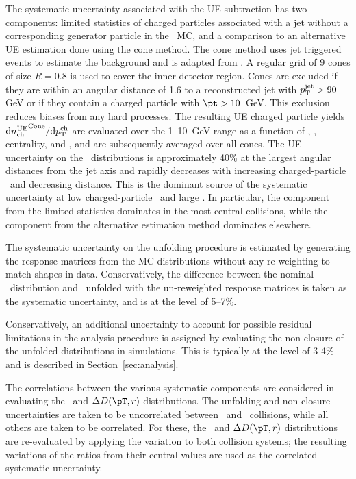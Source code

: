 The systematic uncertainty associated with the UE subtraction has two components: limited statistics of charged particles associated with a jet without a corresponding generator particle in the \pbpb\ MC, and a comparison to an alternative UE estimation done using the cone method. The cone method uses jet triggered events to estimate the background and is adapted from \cite{Aaboud:2018hpb, Aaboud:2017bzv}. A regular grid of 9 cones of size $R = 0.8$ is used to cover the inner detector region. Cones are excluded if they are within an angular distance of 1.6 to a reconstructed jet with $\mbox{$p_{\mathrm{T}}^{\mathrm{jet}}$} > 90$ GeV or if they contain a charged particle with \mbox{$\pt > 10$ GeV}. This exclusion reduces biases from any hard processes. The resulting UE charged particle yields $\mathrm{d} \mbox{$n_{\mathrm{ch}}^{\mathrm{UE}}$}^{\mathrm{Cone}}/ \mathrm{d} \mbox{$p_{{\mathrm{T}}}^{\mathrm{ch}}$}$ are evaluated over the \mbox{1--10 GeV} range as a function of \pttrk, \ptjet, centrality, and \rvar, and are subsequently averaged over all cones. The UE uncertainty on the \Dptr\ distributions is approximately 40\% at the largest angular distances from the jet axis and rapidly decreases with increasing charged-particle \pT\ and decreasing distance. This is the dominant source of the systematic uncertainty at low charged-particle \pt\ and large \rvar. In particular, the component from the limited statistics dominates in the most central collisions, while the component from the alternative estimation method dominates elsewhere.


The systematic uncertainty on the unfolding procedure is estimated by generating the response matrices from the MC distributions without any re-weighting to match shapes in data. Conservatively, the difference between the nominal \Dptr\ distribution and \Dptr\ unfolded with the un-reweighted response matrices is taken as the systematic uncertainty, and is at the level of 5--7\%.

Conservatively, an additional uncertainty to account for possible residual limitations in the analysis procedure is assigned by evaluating the non-closure of the unfolded distributions in simulations. This is typically at the level of 3-4\% and is described in Section~\ref{sec:analysis}.

The correlations between the various systematic components are considered in evaluating the \RDptr\ and $\Delta\Dptr$ distributions. The unfolding and non-closure uncertainties are taken to be uncorrelated between \pp\ and \pbpb\ collisions, while all others are taken to be correlated. For these, the \RDptr\ and $\Delta\Dptr$ distributions are re-evaluated by applying the variation to both collision systems; the resulting variations of the ratios from their central values are used as the correlated systematic uncertainty. 

